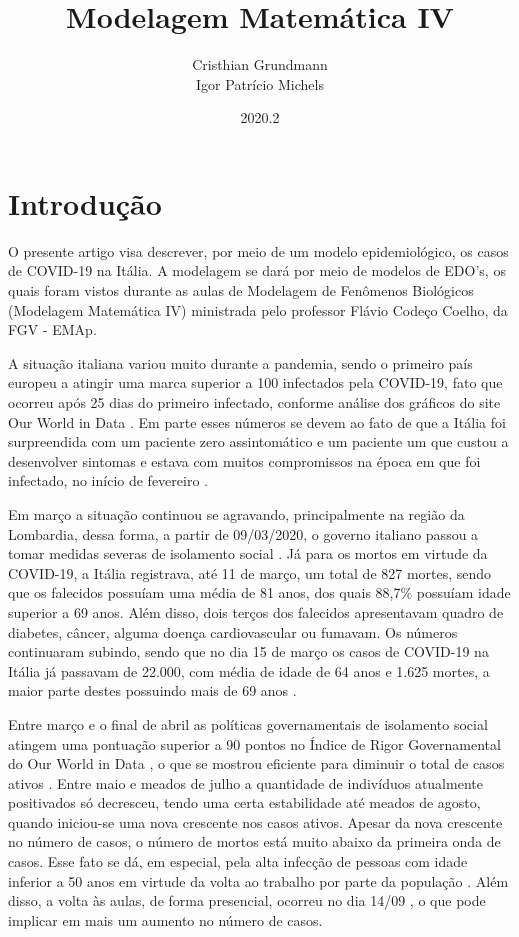 \documentclass{article}
\title{Modelagem Matemática IV}
\author{Cristhian Grundmann \\
Igor Patrício Michels}
\date{2020.2}
\begin{document}
\maketitle

\section{Introdução}

O presente artigo visa descrever, por meio de um modelo epidemiológico, os casos de COVID-19 na Itália. A modelagem se dará por meio de modelos de EDO's, os quais foram vistos durante as aulas de Modelagem de Fenômenos Biológicos (Modelagem Matemática IV) ministrada pelo professor Flávio Codeço Coelho, da FGV - EMAp.

A situação italiana variou muito durante a pandemia, sendo o primeiro país europeu a atingir uma marca superior a 100 infectados pela COVID-19, fato que ocorreu após 25 dias do primeiro infectado, conforme análise dos gráficos do site Our World in Data \cite{owid}. Em parte esses números se devem ao fato de que a Itália foi surpreendida com um paciente zero assintomático e um paciente um que custou a desenvolver sintomas e estava com muitos compromissos na época em que foi infectado, no início de fevereiro \cite{dn}\cite{cm}.

Em março a situação continuou se agravando, principalmente na região da Lombardia, dessa forma, a partir de 09/03/2020, o governo italiano passou a tomar medidas severas de isolamento social \cite{piccolomini}. Já para os mortos em virtude da COVID-19, a Itália registrava, até 11 de março, um total de 827 mortes, sendo que os falecidos possuíam uma média de 81 anos, dos quais 88,7\% possuíam idade superior a 69 anos. Além disso, dois terços dos falecidos apresentavam quadro de diabetes, câncer, alguma doença cardiovascular ou fumavam. Os números continuaram subindo, sendo que no dia 15 de março os casos de COVID-19 na Itália já passavam de 22.000, com média de idade de 64 anos e 1.625 mortes, a maior parte destes possuindo mais de 69 anos \cite{REMUZZI20201225}\cite{10.1001/jama.2020.4344}.

Entre março e o final de abril as políticas governamentais de isolamento social atingem uma pontuação superior a 90 pontos no Índice de Rigor Governamental do Our World in Data \cite{owid}, o que se mostrou eficiente para diminuir o total de casos ativos \cite{italia}. Entre maio e meados de julho a quantidade de indivíduos atualmente positivados só decresceu, tendo uma certa estabilidade até meados de agosto, quando iniciou-se uma nova crescente nos casos ativos.
Apesar da nova crescente no número de casos, o número de mortos está muito abaixo da primeira onda de casos. Esse fato se dá, em especial, pela alta infecção de pessoas com idade inferior a 50 anos \cite{istoe_idade} em virtude da volta ao trabalho por parte da população \cite{folha_trabalho}. Além disso, a volta às aulas, de forma presencial, ocorreu no dia 14/09 \cite{uol_aulas}, o que pode implicar em mais um aumento no número de casos.
\end{document}
